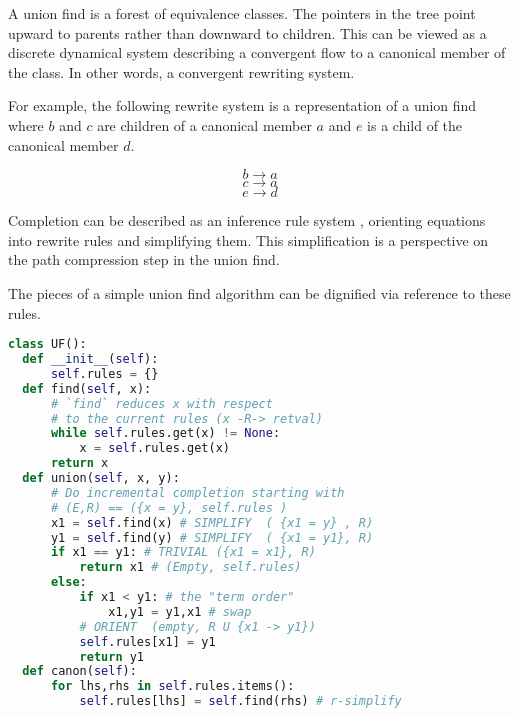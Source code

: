 \documentclass[sigplan,10pt,review,anonymous]{acmart}
\begin{document}
A union find is a forest of equivalence classes. The pointers in the tree point upward to parents rather than downward to children. This can be viewed as a discrete dynamical system describing a convergent flow to a canonical member of the class. In other words, a convergent rewriting system.

For example, the following rewrite system is a representation of a union find where $b$ and $c$ are children of a canonical member $a$ and $e$ is a child of the canonical member $d$. 

$$b \rightarrow a$$
$$c \rightarrow a$$
$$e \rightarrow  d$$

Completion can be described as an inference rule system \cite{traatbook}, orienting equations into rewrite rules and simplifying them. This simplification is a perspective on the path compression step in the union find.

The pieces of a simple union find algorithm can be dignified via reference to these rules.

\begin{lstlisting}[language=Python,  basicstyle=\tiny]
class UF():
  def __init__(self):
      self.rules = {}
  def find(self, x):
      # `find` reduces x with respect 
      # to the current rules (x -R-> retval)
      while self.rules.get(x) != None:
          x = self.rules.get(x)
      return x
  def union(self, x, y):
      # Do incremental completion starting with
      # (E,R) == ({x = y}, self.rules )
      x1 = self.find(x) # SIMPLIFY  ( {x1 = y} , R)
      y1 = self.find(y) # SIMPLIFY  ( {x1 = y1}, R)
      if x1 == y1: # TRIVIAL ({x1 = x1}, R)
          return x1 # (Empty, self.rules)
      else:
          if x1 < y1: # the "term order"
              x1,y1 = y1,x1 # swap
          # ORIENT  (empty, R U {x1 -> y1})
          self.rules[x1] = y1 
          return y1
  def canon(self):
      for lhs,rhs in self.rules.items():
          self.rules[lhs] = self.find(rhs) # r-simplify
\end{lstlisting}



\end{document}
